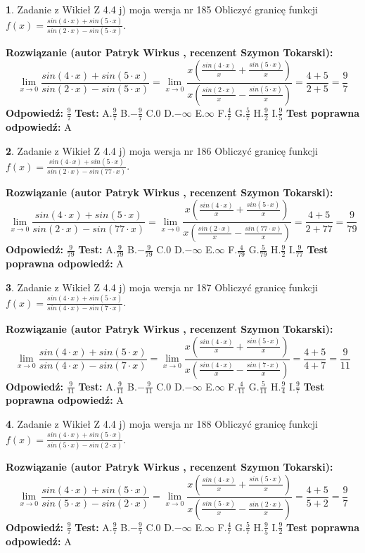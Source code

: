 \documentclass[12pt, a4paper]{article}
\theoremstyle{definition} %
\newtheorem{zad}{}
\newcommand{\zadStart}[1]{\begin{zad}#1\newline}
\newcommand{\zadStop}{\end{zad}}
\newcommand{\rozwStart}[2]{\noindent \textbf{Rozwiązanie (autor #1 , recenzent #2): }\newline}
\newcommand{\rozwStop}{\newline}
\newcommand{\odpStart}{\noindent \textbf{Odpowiedź:}\newline}
\newcommand{\odpStop}{\newline}
\newcommand{\testStart}{\noindent \textbf{Test:}\newline}
\newcommand{\testStop}{\newline}
\newcommand{\kluczStart}{\noindent \textbf{Test poprawna odpowiedź:}\newline}
\newcommand{\kluczStop}{\newline}
\begin{document}
\zadStart{Zadanie z Wikieł Z 4.4 j) moja wersja nr 185}
Obliczyć granicę funkcji $f(x)=\frac{sin(4\cdot x) +sin(5\cdot x)}{sin(2\cdot x) -sin(5\cdot x)}$.
\zadStop
\rozwStart{Patryk Wirkus}{Szymon Tokarski}
$$\lim\limits_{x\to 0}\frac{sin(4\cdot x) +sin(5\cdot x)}{sin(2\cdot x) -sin(5\cdot x)}=\lim\limits_{x\to 0}\frac{x(\frac{sin(4\cdot x)}{x}+\frac{sin(5\cdot x)}{x})}{x(\frac{sin(2\cdot x)}{x}-\frac{sin(5\cdot x)}{x})}=\frac{4+5}{2+5} = \frac{9}{7}$$
\rozwStop
\odpStart
$\frac{9}{7}$
\odpStop
\testStart
A.$\frac{9}{7}$
B.$-\frac{9}{7}$
C.$0$
D.$-\infty$
E.$\infty$
F.$\frac{4}{7}$
G.$\frac{5}{7}$
H.$\frac{9}{2}$
I.$\frac{9}{5}$
\testStop
\kluczStart
A
\kluczStop



\zadStart{Zadanie z Wikieł Z 4.4 j) moja wersja nr 186}
Obliczyć granicę funkcji $f(x)=\frac{sin(4\cdot x) +sin(5\cdot x)}{sin(2\cdot x) -sin(77\cdot x)}$.
\zadStop
\rozwStart{Patryk Wirkus}{Szymon Tokarski}
$$\lim\limits_{x\to 0}\frac{sin(4\cdot x) +sin(5\cdot x)}{sin(2\cdot x) -sin(77\cdot x)}=\lim\limits_{x\to 0}\frac{x(\frac{sin(4\cdot x)}{x}+\frac{sin(5\cdot x)}{x})}{x(\frac{sin(2\cdot x)}{x}-\frac{sin(77\cdot x)}{x})}=\frac{4+5}{2+77} = \frac{9}{79}$$
\rozwStop
\odpStart
$\frac{9}{79}$
\odpStop
\testStart
A.$\frac{9}{79}$
B.$-\frac{9}{79}$
C.$0$
D.$-\infty$
E.$\infty$
F.$\frac{4}{79}$
G.$\frac{5}{79}$
H.$\frac{9}{2}$
I.$\frac{9}{77}$
\testStop
\kluczStart
A
\kluczStop



\zadStart{Zadanie z Wikieł Z 4.4 j) moja wersja nr 187}
Obliczyć granicę funkcji $f(x)=\frac{sin(4\cdot x) +sin(5\cdot x)}{sin(4\cdot x) -sin(7\cdot x)}$.
\zadStop
\rozwStart{Patryk Wirkus}{Szymon Tokarski}
$$\lim\limits_{x\to 0}\frac{sin(4\cdot x) +sin(5\cdot x)}{sin(4\cdot x) -sin(7\cdot x)}=\lim\limits_{x\to 0}\frac{x(\frac{sin(4\cdot x)}{x}+\frac{sin(5\cdot x)}{x})}{x(\frac{sin(4\cdot x)}{x}-\frac{sin(7\cdot x)}{x})}=\frac{4+5}{4+7} = \frac{9}{11}$$
\rozwStop
\odpStart
$\frac{9}{11}$
\odpStop
\testStart
A.$\frac{9}{11}$
B.$-\frac{9}{11}$
C.$0$
D.$-\infty$
E.$\infty$
F.$\frac{4}{11}$
G.$\frac{5}{11}$
H.$\frac{9}{4}$
I.$\frac{9}{7}$
\testStop
\kluczStart
A
\kluczStop



\zadStart{Zadanie z Wikieł Z 4.4 j) moja wersja nr 188}
Obliczyć granicę funkcji $f(x)=\frac{sin(4\cdot x) +sin(5\cdot x)}{sin(5\cdot x) -sin(2\cdot x)}$.
\zadStop
\rozwStart{Patryk Wirkus}{Szymon Tokarski}
$$\lim\limits_{x\to 0}\frac{sin(4\cdot x) +sin(5\cdot x)}{sin(5\cdot x) -sin(2\cdot x)}=\lim\limits_{x\to 0}\frac{x(\frac{sin(4\cdot x)}{x}+\frac{sin(5\cdot x)}{x})}{x(\frac{sin(5\cdot x)}{x}-\frac{sin(2\cdot x)}{x})}=\frac{4+5}{5+2} = \frac{9}{7}$$
\rozwStop
\odpStart
$\frac{9}{7}$
\odpStop
\testStart
A.$\frac{9}{7}$
B.$-\frac{9}{7}$
C.$0$
D.$-\infty$
E.$\infty$
F.$\frac{4}{7}$
G.$\frac{5}{7}$
H.$\frac{9}{5}$
I.$\frac{9}{2}$
\testStop
\kluczStart
A
\kluczStop
\end{document}

